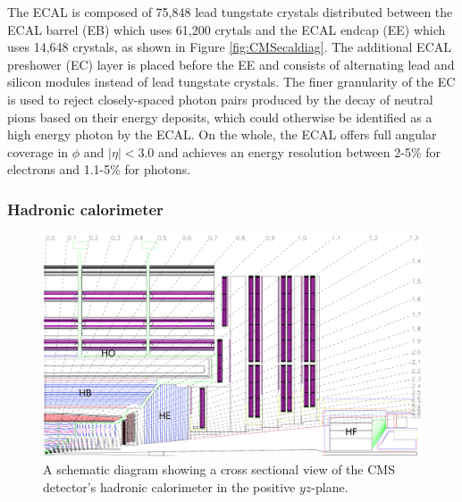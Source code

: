 The ECAL is composed of 75,848 lead tungstate crystals distributed between the ECAL barrel (EB) which uses 61,200 crytals and the ECAL endcap (EE) which uses 14,648 crystals, as shown in Figure \ref{fig:CMSecaldiag}. The additional ECAL preshower (EC) layer is placed before the EE and consists of alternating lead and silicon modules instead of lead tungstate crystals. The finer granularity of the EC is used to reject closely-spaced photon pairs produced by the decay of neutral pions based on their energy deposits, which could otherwise be identified as a high energy photon by the ECAL. On the whole, the ECAL offers full angular coverage in $\phi$ and $\left| \eta \right| < 3.0$ and achieves an energy resolution between 2-5\% for electrons and 1.1-5\% for photons.\cite{CMSECALPERF}

\subsubsection{Hadronic calorimeter}

\begin{figure}[htbp]
  \centering
    \includegraphics[width=5.5in]{images/hcal_diagram}
    \caption[Schematic for the CMS HCAL]{A schematic diagram showing a cross sectional view of the CMS detector's hadronic calorimeter in the positive $yz$-plane.\cite{HCALDIAGRAM}}
    \label{fig:CMShcaldiag}
\end{figure}

